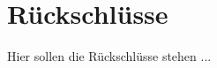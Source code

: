 \section{Rückschlüsse} \label{chpt:Ergebnisse_Rueckschluesse}
Hier sollen die Rückschlüsse stehen ...